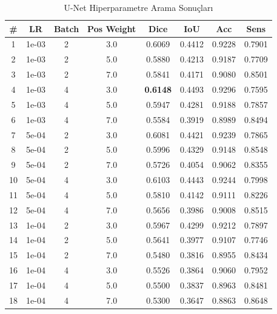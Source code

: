 \begin{table}[htbp]
\centering
\caption{U-Net Hiperparametre Arama Sonuçları}
\label{tab:hyperparam_unet}
\begin{tabular}{cccccccc}
\hline
\textbf{\#} & \textbf{LR} & \textbf{Batch} & \textbf{Pos Weight} & \textbf{Dice} & \textbf{IoU} & \textbf{Acc} & \textbf{Sens} \\
\hline
1 & 1e-03 & 2 & 3.0 & 0.6069 & 0.4412 & 0.9228 & 0.7901 \\
2 & 1e-03 & 2 & 5.0 & 0.5880 & 0.4213 & 0.9187 & 0.7709 \\
3 & 1e-03 & 2 & 7.0 & 0.5841 & 0.4171 & 0.9080 & 0.8501 \\
4 & 1e-03 & 4 & 3.0 & \textbf{0.6148} & 0.4493 & 0.9296 & 0.7595 \\
5 & 1e-03 & 4 & 5.0 & 0.5947 & 0.4281 & 0.9188 & 0.7857 \\
6 & 1e-03 & 4 & 7.0 & 0.5584 & 0.3919 & 0.8989 & 0.8494 \\
7 & 5e-04 & 2 & 3.0 & 0.6081 & 0.4421 & 0.9239 & 0.7865 \\
8 & 5e-04 & 2 & 5.0 & 0.5996 & 0.4329 & 0.9148 & 0.8548 \\
9 & 5e-04 & 2 & 7.0 & 0.5726 & 0.4054 & 0.9062 & 0.8355 \\
10 & 5e-04 & 4 & 3.0 & 0.6103 & 0.4443 & 0.9244 & 0.7998 \\
11 & 5e-04 & 4 & 5.0 & 0.5810 & 0.4142 & 0.9111 & 0.8226 \\
12 & 5e-04 & 4 & 7.0 & 0.5656 & 0.3986 & 0.9008 & 0.8515 \\
13 & 1e-04 & 2 & 3.0 & 0.5967 & 0.4299 & 0.9212 & 0.7897 \\
14 & 1e-04 & 2 & 5.0 & 0.5641 & 0.3977 & 0.9107 & 0.7746 \\
15 & 1e-04 & 2 & 7.0 & 0.5480 & 0.3816 & 0.8955 & 0.8434 \\
16 & 1e-04 & 4 & 3.0 & 0.5526 & 0.3864 & 0.9060 & 0.7952 \\
17 & 1e-04 & 4 & 5.0 & 0.5500 & 0.3837 & 0.8963 & 0.8481 \\
18 & 1e-04 & 4 & 7.0 & 0.5300 & 0.3647 & 0.8863 & 0.8648 \\
\hline
\end{tabular}
\end{table}

